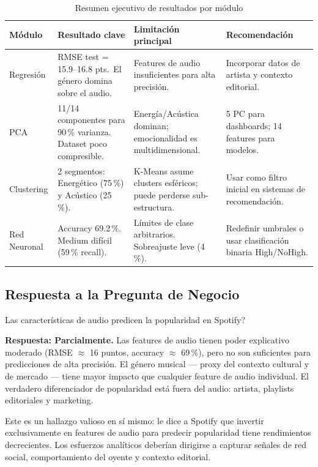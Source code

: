 \documentclass[12pt,a4paper]{article}
\begin{document}
\begin{table}[H]
\centering
\caption{Resumen ejecutivo de resultados por m\'odulo}
\small
\begin{tabular}{p{2.4cm}p{3.4cm}p{3.4cm}p{3.6cm}}
\toprule
\textbf{M\'odulo} & \textbf{Resultado clave} &
  \textbf{Limitaci\'on principal} & \textbf{Recomendaci\'on} \\
\midrule
Regresi\'on &
  RMSE test = 15.9--16.8 pts.\ El g\'enero domina sobre el audio. &
  Features de audio insuficientes para alta precisi\'on. &
  Incorporar datos de artista y contexto editorial. \\[5pt]
PCA &
  11/14 componentes para 90\,\% varianza. Dataset poco compresible. &
  Energ\'ia/Ac\'ustica dominan; emocionalidad es multidimensional. &
  5 PC para dashboards; 14 features para modelos. \\[5pt]
Clustering &
  2 segmentos: Energ\'etico (75\,\%) y Ac\'ustico (25\,\%). &
  K-Means asume clusters esf\'ericos; puede perderse sub-estructura. &
  Usar como filtro inicial en sistemas de recomendaci\'on. \\[5pt]
Red Neuronal &
  Accuracy 69.2\,\%. Medium dif\'icil (59\,\% recall). &
  L\'imites de clase arbitrarios. Sobreajuste leve (4\,\%). &
  Redefinir umbrales o usar clasificaci\'on binaria High/NoHigh. \\
\bottomrule
\end{tabular}
\end{table}

\subsection{Respuesta a la Pregunta de Negocio}

\textquestiondown Las caracter\'isticas de audio predicen la popularidad en Spotify?

\textbf{Respuesta: Parcialmente.} Las features de audio tienen poder explicativo moderado
(RMSE $\approx$ 16 puntos, accuracy $\approx$ 69\,\%), pero no son suficientes para
predicciones de alta precisi\'on. El g\'enero musical --- proxy del contexto cultural y de
mercado --- tiene mayor impacto que cualquier feature de audio individual. El verdadero
diferenciador de popularidad est\'a fuera del audio: artista, playlists editoriales y
marketing.

Este es un hallazgo valioso en s\'i mismo: le dice a Spotify que invertir exclusivamente
en features de audio para predecir popularidad tiene rendimientos decrecientes. Los
esfuerzos anal\'iticos deber\'ian dirigirse a capturar se\~nales de red social,
comportamiento del oyente y contexto editorial.
\end{document}

